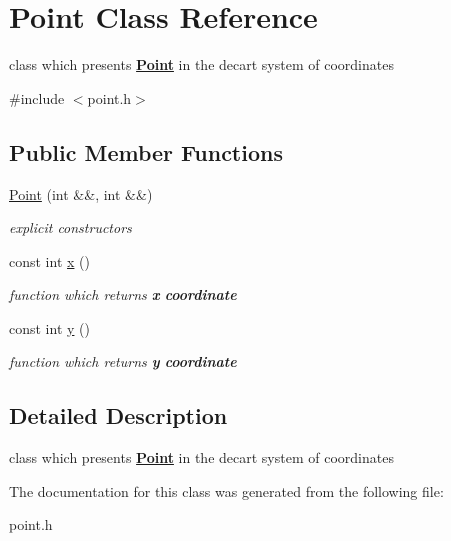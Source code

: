 \hypertarget{class_point}{}\section{Point Class Reference}
\label{class_point}


class which presents {\bfseries{\mbox{\hyperlink{class_point}{Point}}}} in the decart system of coordinates  




{\ttfamily \#include $<$point.\+h$>$}

\subsection*{Public Member Functions}
\begin{DoxyCompactItemize}
\item 
\mbox{\label{class_point_a43c9b70bfe028a77c78390eefea669e5}} 
\mbox{\hyperlink{class_point_a43c9b70bfe028a77c78390eefea669e5}{Point}} (int \&\&, int \&\&)
\begin{DoxyCompactList}\small\item\em explicit {\itshape constructors} \end{DoxyCompactList}\item 
\mbox{\label{class_point_a55ffaadd18da068525fa7ebbd87fdef7}} 
const int \mbox{\hyperlink{class_point_a55ffaadd18da068525fa7ebbd87fdef7}{x}} ()
\begin{DoxyCompactList}\small\item\em {\itshape function} which returns {\bfseries{x}} {\bfseries{coordinate}} \end{DoxyCompactList}\item 
\mbox{\label{class_point_a58d5199edf49c144fabe434a3b083a62}} 
const int \mbox{\hyperlink{class_point_a58d5199edf49c144fabe434a3b083a62}{y}} ()
\begin{DoxyCompactList}\small\item\em {\itshape function} which returns {\bfseries{y}} {\bfseries{coordinate}} \end{DoxyCompactList}\end{DoxyCompactItemize}


\subsection{Detailed Description}
class which presents {\bfseries{\mbox{\hyperlink{class_point}{Point}}}} in the decart system of coordinates 

The documentation for this class was generated from the following file\+:\begin{DoxyCompactItemize}
\item 
point.\+h\end{DoxyCompactItemize}
